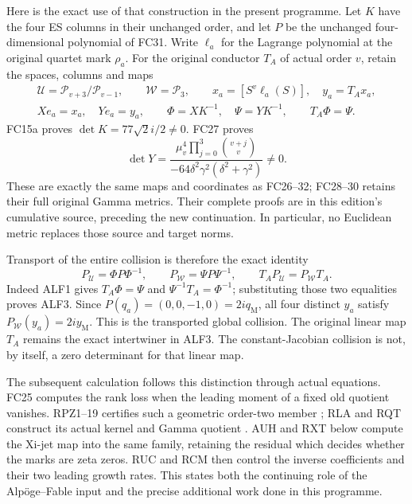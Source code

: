 \documentclass[11pt]{article}
\begin{document}
Here is the exact use of that construction in the present programme.
Let $K$ have the four ES columns in their unchanged order, and let
$P$ be the unchanged four-dimensional polynomial of FC31. Write
$\ell_a$ for the Lagrange polynomial at the original quartet mark
$\rho_a$. For the original conductor $T_A$ of actual order $v$,
retain the spaces, columns and maps
\[
\begin{gathered}
 \mathcal U=\mathcal P_{v+3}/\mathcal P_{v-1},\qquad
 \mathcal W=\mathcal P_3,\qquad
 x_a=[S^v\ell_a(S)],\quad y_a=T_Ax_a,\\
 Xe_a=x_a,\quad Ye_a=y_a,\qquad
 \Phi=XK^{-1},\quad\Psi=YK^{-1},\qquad T_A\Phi=\Psi.
 \tag{ALF1}
\end{gathered}
\]
FC15a proves $\det K=77\sqrt2 i/2\ne0$. FC27 proves
\[
 \det Y=
 \frac{\mu_v^4\prod_{j=0}^3\binom{v+j}{v}}
 {-64\delta^2\gamma^2(\delta^2+\gamma^2)}\ne0.
 \tag{ALF2}
\]
These are exactly the same maps and coordinates as FC26--32;
FC28--30 retains their full original Gamma metrics. Their complete
proofs are in this edition's cumulative source, preceding the new
continuation. In particular, no Euclidean metric replaces those
source and target norms.

Transport of the entire collision is therefore the exact identity
\[
 P_{\mathcal U}=\Phi P\Phi^{-1},\qquad
 P_{\mathcal W}=\Psi P\Psi^{-1},\qquad
 T_AP_{\mathcal U}=P_{\mathcal W}T_A.
 \tag{ALF3}
\]
Indeed ALF1 gives $T_A\Phi=\Psi$ and
$\Psi^{-1}T_A=\Phi^{-1}$; substituting those two equalities
proves ALF3. Since $P(q_a)=(0,0,-1,0)=2i q_{\mathrm M}$,
all four distinct $y_a$ satisfy
$P_{\mathcal W}(y_a)=2i y_{\mathrm M}$. This is the transported
global collision. The original linear map $T_A$ remains the exact
intertwiner in ALF3. The constant-Jacobian collision is not, by
itself, a zero determinant for that linear map.

The subsequent calculation follows this distinction through actual
equations. FC25 computes the rank loss when the leading moment of
a fixed old quotient vanishes. RPZ1--19 certifies such a geometric
order-two member \cite{RPZ005}; RLA and RQT construct its actual
kernel and Gamma quotient \cite{RLA008,RQT008}. AUH and RXT below
compute the Xi-jet map into the same family, retaining the residual
which decides whether the marks are zeta zeros. RUC and RCM then
control the inverse coefficients and their two leading growth rates.
This states both the continuing role of the Alp\"oge--Fable input
and the precise additional work done in this programme.
\end{document}
